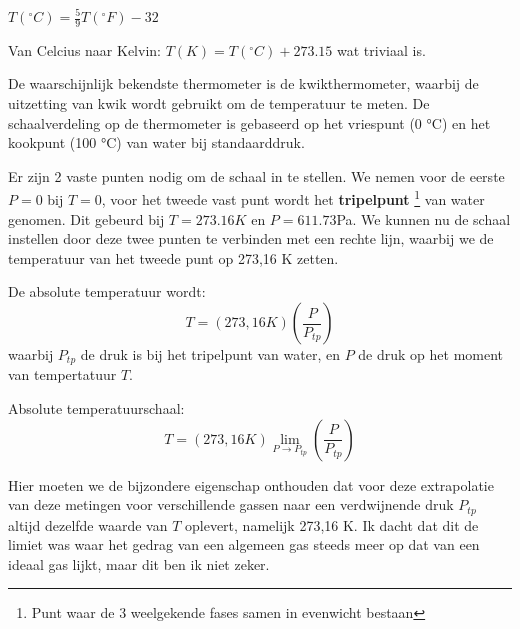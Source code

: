 \(T(^\circ C) = \frac{5}{9}T(^\circ F) - 32\)

Van Celcius naar Kelvin: \(T(K) = T(^\circ C) + 273.15\) wat triviaal is.

De waarschijnlijk bekendste thermometer is de kwikthermometer, waarbij de uitzetting van kwik wordt gebruikt om de temperatuur te meten. De schaalverdeling op de thermometer is gebaseerd op het vriespunt (0 °C) en het kookpunt (100 °C) van water bij standaarddruk.

Er zijn 2 vaste punten nodig om de schaal in te stellen. We nemen voor de eerste \(P=0\) bij \(T=0\), voor het tweede vast punt wordt het \textbf{tripelpunt} \footnote{Punt waar de 3 weelgekende fases samen in evenwicht bestaan} van water genomen. Dit gebeurd bij \(T = 273.16 K\) en \(P=611.73\)Pa.
We kunnen nu de schaal instellen door deze twee punten te verbinden met een rechte lijn, waarbij we de temperatuur van het tweede punt op 273,16 K zetten. 

De absolute temperatuur wordt:
\[
T = (273,16 K)\left( \frac{P}{P_{tp}} \right)
\]
waarbij \(P_{tp}\) de druk is bij het tripelpunt van water, en \(P\) de druk op het moment van tempertatuur \(T\).

Absolute temperatuurschaal:
\[
T =(273,16 K) \lim_{P \to P_{tp}} \left( \frac{P}{P_{tp}} \right)
\]

Hier moeten we de bijzondere eigenschap onthouden dat voor deze extrapolatie van deze metingen voor verschillende gassen naar een verdwijnende druk \(P_{tp}\) altijd dezelfde waarde van \(T\) oplevert, namelijk 273,16 K.
Ik dacht dat dit de limiet was waar het gedrag van een algemeen gas steeds meer op dat van een ideaal gas lijkt, maar dit ben ik niet zeker.